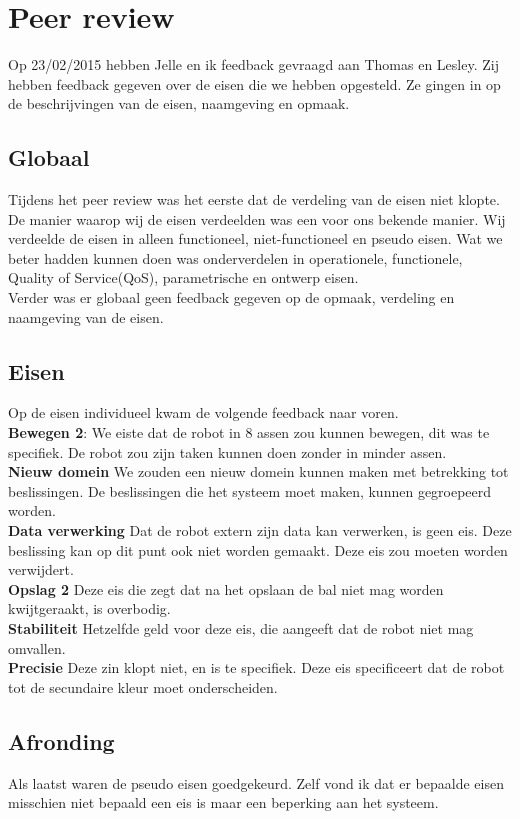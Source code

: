 \documentclass[12pt]{article} %
\begin{document}
\section*{Peer review}
Op 23/02/2015 hebben Jelle en ik feedback gevraagd aan Thomas en Lesley. Zij hebben feedback gegeven over de eisen die we hebben opgesteld. Ze gingen in op de beschrijvingen van de eisen, naamgeving en opmaak.
\subsection*{Globaal}
Tijdens het peer review was het eerste dat de verdeling van de eisen niet klopte. De manier waarop wij de eisen verdeelden was een voor ons bekende manier. Wij verdeelde de eisen in alleen functioneel, niet-functioneel en pseudo eisen. Wat we beter hadden kunnen doen was onderverdelen in operationele, functionele, Quality of Service(QoS), parametrische en ontwerp eisen. \\
Verder was er globaal geen feedback gegeven op de opmaak, verdeling en naamgeving van de eisen.
\subsection*{Eisen}
Op de eisen individueel kwam de volgende feedback naar voren. \\
\textbf{Bewegen 2}: We eiste dat de robot in 8 assen zou kunnen bewegen, dit was te specifiek. De robot zou zijn taken kunnen doen zonder in minder assen. \\
\textbf{Nieuw domein} We zouden een nieuw domein kunnen maken met betrekking tot beslissingen. De beslissingen die het systeem moet maken, kunnen gegroepeerd worden.\\
\textbf{Data verwerking} Dat de robot extern zijn data kan verwerken, is geen eis. Deze beslissing kan op dit punt ook niet worden gemaakt. Deze eis zou moeten worden verwijdert.\\
\textbf{Opslag 2} Deze eis die zegt dat na het opslaan de bal niet mag worden kwijtgeraakt, is overbodig. \\
\textbf{Stabiliteit} Hetzelfde geld voor deze eis, die aangeeft dat de robot niet mag omvallen.\\
\textbf{Precisie} Deze zin klopt niet, en is te specifiek. Deze eis specificeert dat de robot tot de secundaire kleur moet onderscheiden.
\subsection*{Afronding}
Als laatst waren de pseudo eisen goedgekeurd. Zelf vond ik dat er bepaalde eisen misschien niet bepaald een eis is maar een beperking aan het systeem. 
\end{document}
